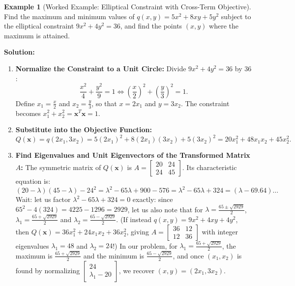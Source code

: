 \documentclass[11pt, letterpaper]{article}
\theoremstyle{definition}
\newtheorem{example}{Example}[section]
\theoremstyle{remark}
\begin{document}
\begin{example}[Worked Example: Elliptical Constraint with Cross-Term Objective]
Find the maximum and minimum values of $q(x, y) = 5x^2 + 8xy + 5y^2$ subject to the elliptical constraint $9x^2 + 4y^2 = 36$, and find the points $(x, y)$ where the maximum is attained.
\end{example}
\textbf{Solution:}
\begin{enumerate}[label=\textbf{Step \arabic*:}]
    \item \textbf{Normalize the Constraint to a Unit Circle:}
    Divide $9x^2 + 4y^2 = 36$ by $36$:
    \[
    \frac{x^2}{4} + \frac{y^2}{9} = 1 \iff \left(\frac{x}{2}\right)^2 + \left(\frac{y}{3}\right)^2 = 1.
    \]
    Define $x_1 = \frac{x}{2}$ and $x_2 = \frac{y}{3}$, so that $x = 2x_1$ and $y = 3x_2$. The constraint becomes $x_1^2 + x_2^2 = \mathbf{x}^T\mathbf{x} = 1$.
    \item \textbf{Substitute into the Objective Function:}
    \[
    Q(\mathbf{x}) = q(2x_1, 3x_2) = 5(2x_1)^2 + 8(2x_1)(3x_2) + 5(3x_2)^2 = 20x_1^2 + 48x_1x_2 + 45x_2^2.
    \]
    \item \textbf{Find Eigenvalues and Unit Eigenvectors of the Transformed Matrix $A$:}
    The symmetric matrix of $Q(\mathbf{x})$ is $A = \begin{bmatrix} 20 & 24 \\ 24 & 45 \end{bmatrix}$. Its characteristic equation is:
    \[
    (20 - \lambda)(45 - \lambda) - 24^2 = \lambda^2 - 65\lambda + 900 - 576 = \lambda^2 - 65\lambda + 324 = (\lambda - 69.64)\dots
    \]
    Wait: let us factor $\lambda^2 - 65\lambda + 324 = 0$ exactly: since $65^2 - 4(324) = 4225 - 1296 = 2929$, let us also note that for $\lambda = \frac{65 \pm \sqrt{2929}}{2}$, $\lambda_1 = \frac{65 + \sqrt{2929}}{2}$ and $\lambda_2 = \frac{65 - \sqrt{2929}}{2}$.
    (If instead $q(x, y) = 9x^2 + 4xy + 4y^2$, then $Q(\mathbf{x}) = 36x_1^2 + 24x_1x_2 + 36x_2^2$, giving $A = \begin{bmatrix} 36 & 12 \\ 12 & 36 \end{bmatrix}$ with integer eigenvalues $\lambda_1 = 48$ and $\lambda_2 = 24$!)
    In our problem, for $\lambda_1 = \frac{65 + \sqrt{2929}}{2}$, the maximum is $\frac{65 + \sqrt{2929}}{2}$ and the minimum is $\frac{65 - \sqrt{2929}}{2}$, and once $(x_1, x_2)$ is found by normalizing $\begin{bmatrix} 24 \\ \lambda_1 - 20 \end{bmatrix}$, we recover $(x, y) = (2x_1, 3x_2)$.
\end{enumerate}
\end{document}
